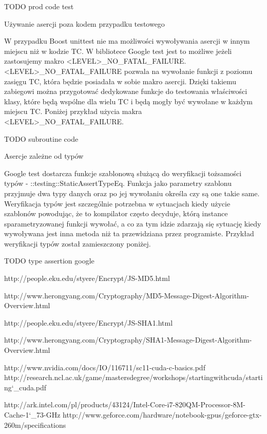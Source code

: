\documentclass[12pt,a4paper,notitlepage]{report}
\begin{document}
TODO prod code test

Używanie asercji poza kodem przypadku testowego

W przypadku Boost unittest nie ma możliwości wywoływania asercji w innym miejscu niż w kodzie TC. W bibliotece Google test jest to możliwe jeżeli zastosujemy makro <LEVEL>_NO_FATAL_FAILURE.
<LEVEL>_NO_FATAL_FAILURE pozwala na wywołanie funkcji z poziomu zasięgu TC, która będzie posiadała w sobie makro asercji. Dzięki takiemu zabiegowi można przygotować dedykowane funkcje do testowania właściwości klasy, które będą wspólne dla wielu TC i będą mogły być wywołane w każdym miejscu TC. Poniżej przykład użycia makra <LEVEL>_NO_FATAL_FAILURE.

TODO subroutine code

Asercje zależne od typów

Google test dostarcza funkcje szablonową służącą do weryfikacji tożsamości typów - ::testing::StaticAssertTypeEq. Funkcja jako parametry szablonu przyjmuje dwa typy danych oraz po jej wywołaniu określa czy są one takie same.
Weryfikacja typów jest szczególnie potrzebna w sytuacjach kiedy użycie szablonów powodując, że to kompilator często decyduje, którą instance sparametryzowanej funkcji wywołać, a co za tym idzie zdarzają się sytuację kiedy wywoływana jest inna metoda niż ta przewidziana przez programiste.
Przykład weryfikacji typów został zamieszczony poniżej.

TODO type assertion google

	
	
	\begin{thebibliography}{1}
		
	   http://people.eku.edu/styere/Encrypt/JS-MD5.html

	    http://www.herongyang.com/Cryptography/MD5-Message-Digest-Algorithm-Overview.html

	   http://people.eku.edu/styere/Encrypt/JS-SHA1.html

	   http://www.herongyang.com/Cryptography/SHA1-Message-Digest-Algorithm-Overview.html


	 http://www.nvidia.com/docs/IO/116711/sc11-cuda-c-basics.pdf
	 http://research.ncl.ac.uk/game/mastersdegree/workshops/startingwithcuda/starting\char`_cuda.pdf
	
	 http://ark.intel.com/pl/products/43124/Intel-Core-i7-820QM-Processor-8M-Cache-1\char`_73-GHz
	 http://www.geforce.com/hardware/notebook-gpus/geforce-gtx-260m/specifications

	 \end{thebibliography}
\end{document}
